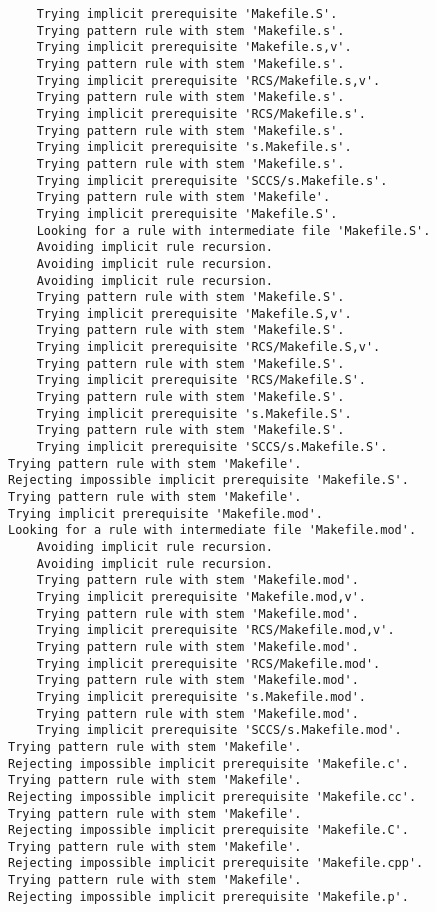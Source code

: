 \documentclass[11pt]{article}
\begin{document}
\begin{enumerate}
\begin{enumerate}
\begin{verbatim}
    Trying implicit prerequisite 'Makefile.S'.
    Trying pattern rule with stem 'Makefile.s'.
    Trying implicit prerequisite 'Makefile.s,v'.
    Trying pattern rule with stem 'Makefile.s'.
    Trying implicit prerequisite 'RCS/Makefile.s,v'.
    Trying pattern rule with stem 'Makefile.s'.
    Trying implicit prerequisite 'RCS/Makefile.s'.
    Trying pattern rule with stem 'Makefile.s'.
    Trying implicit prerequisite 's.Makefile.s'.
    Trying pattern rule with stem 'Makefile.s'.
    Trying implicit prerequisite 'SCCS/s.Makefile.s'.
    Trying pattern rule with stem 'Makefile'.
    Trying implicit prerequisite 'Makefile.S'.
    Looking for a rule with intermediate file 'Makefile.S'.
    Avoiding implicit rule recursion.
    Avoiding implicit rule recursion.
    Avoiding implicit rule recursion.
    Trying pattern rule with stem 'Makefile.S'.
    Trying implicit prerequisite 'Makefile.S,v'.
    Trying pattern rule with stem 'Makefile.S'.
    Trying implicit prerequisite 'RCS/Makefile.S,v'.
    Trying pattern rule with stem 'Makefile.S'.
    Trying implicit prerequisite 'RCS/Makefile.S'.
    Trying pattern rule with stem 'Makefile.S'.
    Trying implicit prerequisite 's.Makefile.S'.
    Trying pattern rule with stem 'Makefile.S'.
    Trying implicit prerequisite 'SCCS/s.Makefile.S'.
Trying pattern rule with stem 'Makefile'.
Rejecting impossible implicit prerequisite 'Makefile.S'.
Trying pattern rule with stem 'Makefile'.
Trying implicit prerequisite 'Makefile.mod'.
Looking for a rule with intermediate file 'Makefile.mod'.
    Avoiding implicit rule recursion.
    Avoiding implicit rule recursion.
    Trying pattern rule with stem 'Makefile.mod'.
    Trying implicit prerequisite 'Makefile.mod,v'.
    Trying pattern rule with stem 'Makefile.mod'.
    Trying implicit prerequisite 'RCS/Makefile.mod,v'.
    Trying pattern rule with stem 'Makefile.mod'.
    Trying implicit prerequisite 'RCS/Makefile.mod'.
    Trying pattern rule with stem 'Makefile.mod'.
    Trying implicit prerequisite 's.Makefile.mod'.
    Trying pattern rule with stem 'Makefile.mod'.
    Trying implicit prerequisite 'SCCS/s.Makefile.mod'.
Trying pattern rule with stem 'Makefile'.
Rejecting impossible implicit prerequisite 'Makefile.c'.
Trying pattern rule with stem 'Makefile'.
Rejecting impossible implicit prerequisite 'Makefile.cc'.
Trying pattern rule with stem 'Makefile'.
Rejecting impossible implicit prerequisite 'Makefile.C'.
Trying pattern rule with stem 'Makefile'.
Rejecting impossible implicit prerequisite 'Makefile.cpp'.
Trying pattern rule with stem 'Makefile'.
Rejecting impossible implicit prerequisite 'Makefile.p'.

\end{verbatim}
\end{enumerate}
\end{enumerate}
\end{document}
